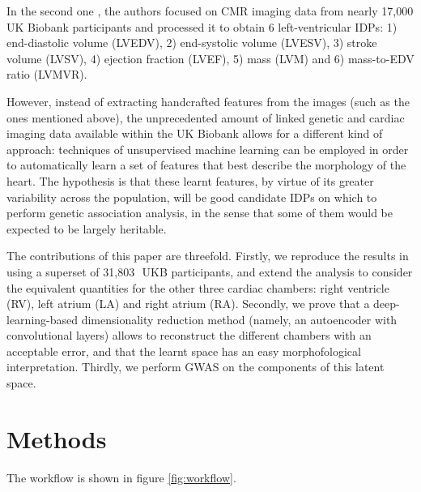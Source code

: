 \documentclass[twocolumn]{llncs}
\newcommand{\NCMR}{31,803\,} %
\begin{document}
In the second one \cite{ref_nayaung}, the authors focused on CMR imaging data from nearly 17,000 UK Biobank participants and processed it to obtain 6 left-ventricular IDPs: 1) end-diastolic volume (LVEDV), 2) end-systolic volume (LVESV), 3) stroke volume (LVSV), 4) ejection fraction (LVEF), 5) mass (LVM) and 6) mass-to-EDV ratio (LVMVR).

However, instead of extracting handcrafted features from the images (such as the ones mentioned above), the unprecedented amount of linked genetic and cardiac imaging data available within the UK Biobank allows for a different kind of approach: techniques of unsupervised machine learning can be employed in order to automatically learn a set of features that best describe the morphology of the heart. 
The hypothesis is that these learnt features, by virtue of its greater variability across the population, will be good candidate IDPs on which to perform genetic association analysis, in the sense that some of them would be expected to be largely heritable.

The contributions of this paper are threefold. Firstly, we reproduce the results in \cite{ref_nayaung} using a superset of \NCMR\, UKB participants, and extend the analysis to consider the equivalent quantities for the other three cardiac chambers: right ventricle (RV), left atrium (LA) and right atrium (RA).
Secondly, we prove that a deep-learning-based dimensionality reduction method (namely, an autoencoder with convolutional layers) allows to reconstruct the different chambers with an acceptable error, and that the learnt space has an easy morphofological interpretation. Thirdly, we perform GWAS on the components of this latent space.

\section{Methods}
The workflow is shown in figure \ref{fig:workflow}.
\end{document}
